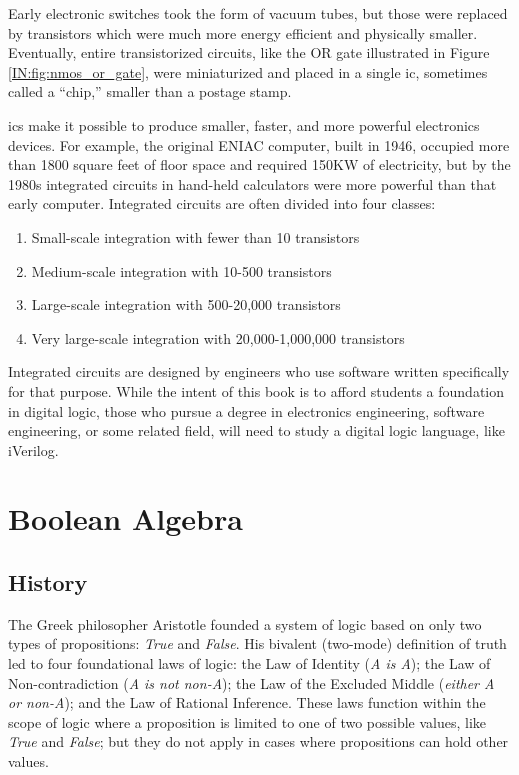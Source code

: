 Early electronic switches took the form of vacuum tubes, but those were replaced by transistors which were much more energy efficient and physically smaller. Eventually, entire transistorized circuits, like the \textsf{OR} gate illustrated in Figure \ref{IN:fig:nmos_or_gate}, were miniaturized and placed in a single \gls{ic}, sometimes called a ``chip,'' smaller than a postage stamp. 

\Glspl{ic} make it possible to produce smaller, faster, and more powerful electronics devices. For example, the original ENIAC computer, built in 1946, occupied more than 1800 square feet of floor space and required 150KW of electricity, but by the 1980s integrated circuits in hand-held calculators were more powerful than that early computer. Integrated circuits are often divided into four classes: 

\begin{enumerate}
  \item Small-scale integration with fewer than 10 transistors
  \item Medium-scale integration with 10-500 transistors
  \item Large-scale integration with 500-20,000 transistors
  \item Very large-scale integration with 20,000-1,000,000 transistors
\end{enumerate}

Integrated circuits are designed by engineers who use software written specifically for that purpose. While the intent of this book is to afford students a foundation in digital logic, those who pursue a degree in electronics engineering, software engineering, or some related field, will need to study a digital logic language, like iVerilog.

\section{Boolean Algebra}

\subsection{History}

The Greek philosopher Aristotle founded a system of logic based on only two types of propositions: \emph{True} and \emph{False}. His bivalent (two-mode) definition of truth led to four foundational laws of logic: the Law of Identity (\emph{A is A}); the Law of Non-contradiction (\emph{A is not non-A}); the Law of the Excluded Middle (\emph{either A or non-A}); and the Law of Rational Inference. These laws function within the scope of logic where a proposition is limited to one of two possible values, like \emph{True} and \emph{False}; but they do not apply in cases where propositions can hold other values.

